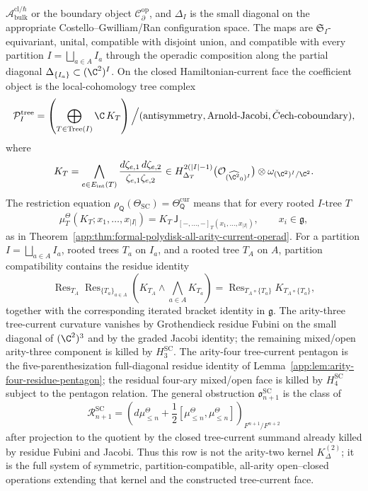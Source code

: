 \begin{defn}
\begin{enumerate}[label=\textup{(D\arabic*)}]
    \(\mathcal A^{\mathrm{cl}/\hbar}_{\mathrm{bulk}}\) or the boundary
    object \(\mathcal C^{\mathrm{op}}_\partial\), and
    \(\Delta_I\) is the small diagonal on the appropriate
    Costello--Gwilliam/Ran configuration space.  The maps are
    \(\mathfrak S_I\)-equivariant, unital, compatible with disjoint
    union, and compatible with every partition
    \(I=\bigsqcup_{a\in A}I_a\) through the operadic composition along
    the partial diagonal
    \(\Delta_{\{I_a\}}\subset(\C^2)^I\).  On the closed Hamiltonian-current
    face the coefficient object is the local-cohomology tree complex
    \[
      \mathcal P^{\mathrm{tree}}_I
      =
      \left(
      \bigoplus_{T\in\operatorname{Tree}(I)}
      \C\,K_T
      \right)\Big/
      (\mathrm{antisymmetry},\mathrm{Arnold\mbox{-}Jacobi},
       \check C\mathrm{ech}\mbox{-}\mathrm{coboundary}),
    \]
    where
    \[
      K_T=
      \bigwedge_{e\in E_{\mathrm{int}}(T)}
      \frac{d\zeta_{e,1}\,d\zeta_{e,2}}
           {\zeta_{e,1}\zeta_{e,2}}
      \in
      H^{2(|I|-1)}_{\Delta_T}
      \bigl(\mathcal O_{(\widehat{\C^2}_0)^I}\bigr)
      \otimes\omega_{(\C^2)^I/\C^2}.
    \]
    The restriction equation
    \(\rho_{\mathsf Q}(\Theta_{\mathrm{SC}})
    =\Theta_{\mathsf Q}^{\mathrm{cur}}\) means that for every rooted
    \(I\)-tree \(T\)
    \[
      \mu_T^\Theta(K_T;x_1,\ldots,x_{|I|})
      =
      K_T\,\mathsf J_{[-,\ldots,-]_T(x_1,\ldots,x_{|I|})},
      \qquad x_i\in\mathfrak g,
    \]
    as in Theorem~\ref{app:thm:formal-polydisk-all-arity-current-operad}.
    For a partition \(I=\bigsqcup_{a\in A}I_a\), rooted trees \(T_a\)
    on \(I_a\), and a rooted tree \(T_A\) on \(A\), partition
    compatibility contains the residue identity
    \[
      \operatorname{Res}_{T_A}
      \operatorname{Res}_{\{T_a\}_{a\in A}}
      \left(K_{T_A}\wedge\bigwedge_{a\in A}K_{T_a}\right)
      =
      \operatorname{Res}_{T_A\circ\{T_a\}}
      K_{T_A\circ\{T_a\}},
    \]
    together with the corresponding iterated bracket identity in
    \(\mathfrak g\).  The arity-three tree-current curvature vanishes by
    Grothendieck residue Fubini on the small diagonal of \((\C^2)^3\)
    and by the graded Jacobi identity; the remaining mixed/open
    arity-three component is killed by \(H^{\mathrm{SC}}_3\).  The
    arity-four tree-current pentagon is the five-parenthesization
    full-diagonal residue identity of
    Lemma~\ref{app:lem:arity-four-residue-pentagon}; the residual
    four-ary mixed/open face is killed by \(H^{\mathrm{SC}}_4\) subject
    to the pentagon relation.  The general
    obstruction \(\mathfrak o^{\mathrm{SC}}_{n+1}\)
    is the class of
    \[
      \mathcal R^{\mathrm{SC}}_{n+1}
      =
      \left(d\mu^\Theta_{\le n}
      +\frac12[\mu^\Theta_{\le n},\mu^\Theta_{\le n}]\right)_{F^{n+1}/F^{n+2}}
    \]
    after projection to the quotient by the closed tree-current summand
    already killed by residue Fubini and Jacobi.  Thus this row is not
    the arity-two kernel \(K^{(2)}_\Delta\); it is the full system of
    symmetric, partition-compatible, all-arity open--closed operations
    extending that kernel and the constructed tree-current face.


\end{enumerate}
\end{defn}
